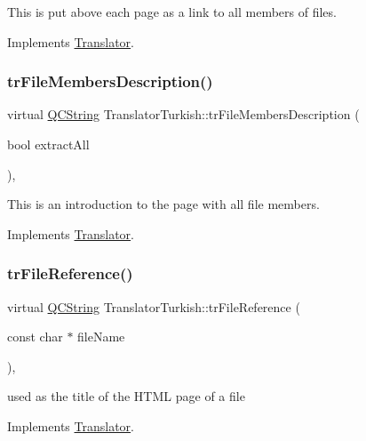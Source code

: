 This is put above each page as a link to all members of files. 

Implements \mbox{\hyperlink{class_translator}{Translator}}.

\mbox{\label{class_translator_turkish_a02159788bad8afc7e9ee3315b2a7110f}} 
\subsubsection{\texorpdfstring{trFileMembersDescription()}{trFileMembersDescription()}}
{\footnotesize\ttfamily virtual \mbox{\hyperlink{class_q_c_string}{Q\+C\+String}} Translator\+Turkish\+::tr\+File\+Members\+Description (\begin{DoxyParamCaption}\item[{bool}]{extract\+All }\end{DoxyParamCaption})\hspace{0.3cm}{\ttfamily [inline]}, {\ttfamily [virtual]}}

This is an introduction to the page with all file members. 

Implements \mbox{\hyperlink{class_translator}{Translator}}.

\mbox{\label{class_translator_turkish_a03d0092a19ae343fde390de7a9c8bcb1}} 
\subsubsection{\texorpdfstring{trFileReference()}{trFileReference()}}
{\footnotesize\ttfamily virtual \mbox{\hyperlink{class_q_c_string}{Q\+C\+String}} Translator\+Turkish\+::tr\+File\+Reference (\begin{DoxyParamCaption}\item[{const char $\ast$}]{file\+Name }\end{DoxyParamCaption})\hspace{0.3cm}{\ttfamily [inline]}, {\ttfamily [virtual]}}

used as the title of the H\+T\+ML page of a file 

Implements \mbox{\hyperlink{class_translator}{Translator}}.


